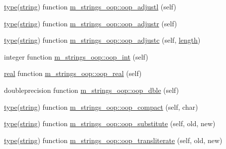 \begin{DoxyCompactItemize}
\item 
\hyperlink{stop__watch_83_8txt_a70f0ead91c32e25323c03265aa302c1c}{type}(\hyperlink{what__overview_81_8txt_a74cb7e955273b9f9157b4f0c18a38849}{string}) function \hyperlink{namespacem__strings__oop_a8e2457b4a1c4489e9600e340fa9ce533}{m\+\_\+strings\+\_\+oop\+::oop\+\_\+adjustl} (self)
\item 
\hyperlink{stop__watch_83_8txt_a70f0ead91c32e25323c03265aa302c1c}{type}(\hyperlink{what__overview_81_8txt_a74cb7e955273b9f9157b4f0c18a38849}{string}) function \hyperlink{namespacem__strings__oop_abb0dfa5646259e4fc768700eada111ac}{m\+\_\+strings\+\_\+oop\+::oop\+\_\+adjustr} (self)
\item 
\hyperlink{stop__watch_83_8txt_a70f0ead91c32e25323c03265aa302c1c}{type}(\hyperlink{what__overview_81_8txt_a74cb7e955273b9f9157b4f0c18a38849}{string}) function \hyperlink{namespacem__strings__oop_a9fa932c23648e737230553a8e7bfb15b}{m\+\_\+strings\+\_\+oop\+::oop\+\_\+adjustc} (self, \hyperlink{M__stopwatch_83_8txt_a04ed5ef37abacfa36a856b5f30376485}{length})
\item 
integer function \hyperlink{namespacem__strings__oop_a2092266bec4014f74b8d436c5a8e319f}{m\+\_\+strings\+\_\+oop\+::oop\+\_\+int} (self)
\item 
\hyperlink{read__watch_83_8txt_abdb62bde002f38ef75f810d3a905a823}{real} function \hyperlink{namespacem__strings__oop_a9709a714bc825704651b00c7384a7547}{m\+\_\+strings\+\_\+oop\+::oop\+\_\+real} (self)
\item 
doubleprecision function \hyperlink{namespacem__strings__oop_aa6eaf2b8a12a905d0ebaa21a84871dec}{m\+\_\+strings\+\_\+oop\+::oop\+\_\+dble} (self)
\item 
\hyperlink{stop__watch_83_8txt_a70f0ead91c32e25323c03265aa302c1c}{type}(\hyperlink{what__overview_81_8txt_a74cb7e955273b9f9157b4f0c18a38849}{string}) function \hyperlink{namespacem__strings__oop_ac02aecbaebcf57833b544de4f50c89a6}{m\+\_\+strings\+\_\+oop\+::oop\+\_\+compact} (self, char)
\item 
\hyperlink{stop__watch_83_8txt_a70f0ead91c32e25323c03265aa302c1c}{type}(\hyperlink{what__overview_81_8txt_a74cb7e955273b9f9157b4f0c18a38849}{string}) function \hyperlink{namespacem__strings__oop_af653c84bbd0165d1d4a3b61efe0472e8}{m\+\_\+strings\+\_\+oop\+::oop\+\_\+substitute} (self, old, new)
\item 
\hyperlink{stop__watch_83_8txt_a70f0ead91c32e25323c03265aa302c1c}{type}(\hyperlink{what__overview_81_8txt_a74cb7e955273b9f9157b4f0c18a38849}{string}) function \hyperlink{namespacem__strings__oop_ac88f27671dd1129023494bf2500ca7fd}{m\+\_\+strings\+\_\+oop\+::oop\+\_\+transliterate} (self, old, new)

\end{DoxyCompactItemize}
